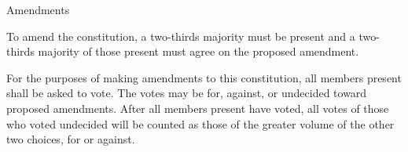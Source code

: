 {
	\begin{article}{Amendments}
		\item To amend the constitution, a two-thirds majority must be present and a two-thirds majority of those present must agree on the proposed amendment.
		\item For the purposes of making amendments to this constitution, all members present shall be asked to vote.  The votes may be for, against, or undecided toward proposed amendments. After all members present have voted, all votes of those who voted undecided will be counted as those of the greater volume of the other two choices, for or against.
	\end{article}
}